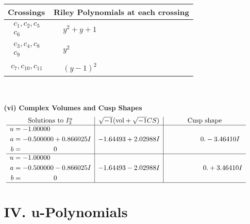 \documentclass[1p]{elsarticle_modified}
\theoremstyle{definition}
\newcommand{\I}{\sqrt{-1}}
\begin{document}
\begin{tabular}{m{50pt}|m{274pt}}
Crossings & \hspace{64pt}Riley Polynomials at each crossing \\
\hline $$\begin{aligned}c_{1},c_{2},c_{5}\\c_{6}\end{aligned}$$&$\begin{aligned}
&y^2+y+1
\end{aligned}$\\
\hline $$\begin{aligned}c_{3},c_{4},c_{8}\\c_{9}\end{aligned}$$&$\begin{aligned}
&y^2
\end{aligned}$\\
\hline $$\begin{aligned}c_{7},c_{10},c_{11}\end{aligned}$$&$\begin{aligned}
&(y-1)^2
\end{aligned}$\\
\hline
\end{tabular}\\~\\
\newpage\flushleft \textbf{(vi) Complex Volumes and Cusp Shapes}
$$\begin{array}{c|c|c}  
\text{Solutions to }I^u_{3}& \I (\text{vol} + \sqrt{-1}CS) & \text{Cusp shape}\\
 \hline 
\begin{aligned}
u &= -1.00000\phantom{ +0.000000I} \\
a &= -0.500000 + 0.866025 I \\
b &= \phantom{-0.000000 } 0\end{aligned}
 & -1.64493 + 2.02988 I & \phantom{-0.000000 } 0. - 3.46410 I \\ \hline\begin{aligned}
u &= -1.00000\phantom{ +0.000000I} \\
a &= -0.500000 - 0.866025 I \\
b &= \phantom{-0.000000 } 0\end{aligned}
 & -1.64493 - 2.02988 I & \phantom{-0.000000 -}0. + 3.46410 I\\
 \hline 
 \end{array}$$\newpage
\newpage\renewcommand{\arraystretch}{1}
\centering \section*{ IV. u-Polynomials}
\end{document}
